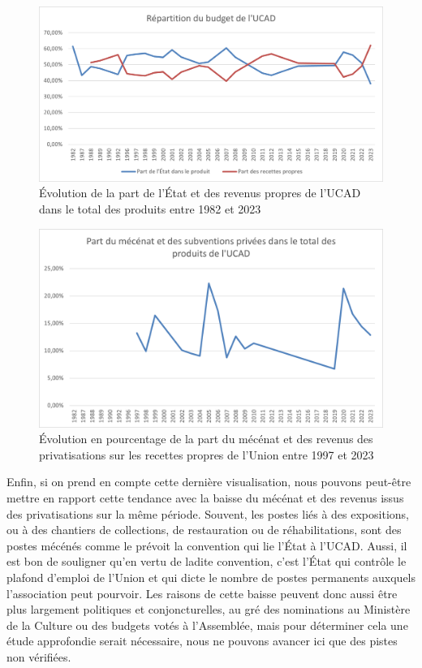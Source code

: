 \begin{figure}[H]
    \centering
    \includegraphics[width=0.75\linewidth]{Illustrations/Image2.png}
    \caption{Évolution de la part de l'État et des revenus propres de l'UCAD dans le total des produits entre 1982 et 2023}
    \label{fig:placeholder}
\end{figure}

\begin{figure}[H]
    \centering
    \includegraphics[width=0.75\linewidth]{Illustrations/Image3.png}
    \caption{Évolution en pourcentage de la part du mécénat et des revenus des privatisations sur les recettes propres de l'Union entre 1997 et 2023}
    \label{fig:placeholder}
\end{figure}

Enfin, si on prend en compte cette dernière visualisation, nous pouvons peut-être mettre en rapport cette tendance avec la baisse du mécénat et des revenus issus des privatisations sur la même période. Souvent, les postes liés à des expositions, ou à des chantiers de collections, de restauration ou de réhabilitations, sont des postes mécénés comme le prévoit la convention qui lie l'État à l'UCAD. Aussi, il est bon de souligner qu'en vertu de ladite convention, c'est l'État qui contrôle le plafond d'emploi de l'Union et qui dicte le nombre de postes permanents auxquels l'association peut pourvoir. Les raisons de cette baisse peuvent donc aussi être plus largement politiques et conjoncturelles, au gré des nominations au Ministère de la Culture ou des budgets votés à l'Assemblée, mais pour déterminer cela une étude approfondie serait nécessaire, nous ne pouvons avancer ici que des pistes non vérifiées. 

